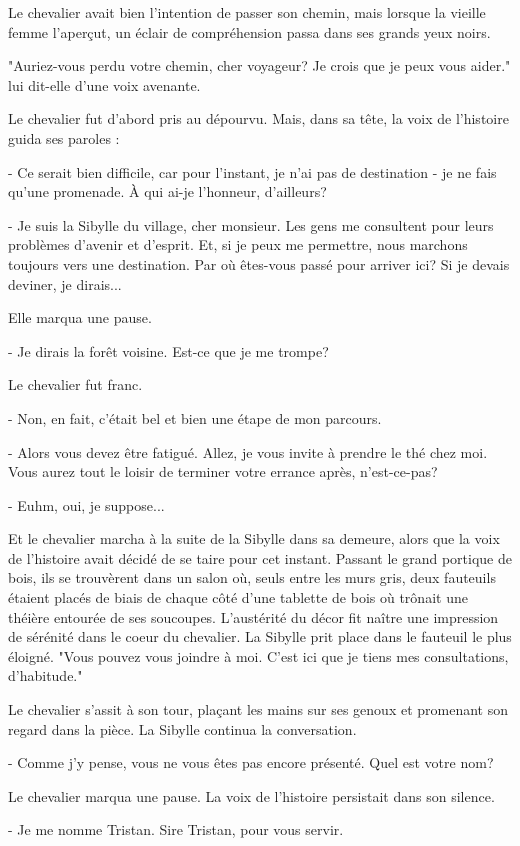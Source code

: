 \documentclass[a4paper,11pt, openany]{book}
\begin{document}
Le chevalier avait bien l'intention de passer son chemin, mais lorsque la vieille femme l'aperçut, un éclair de compréhension passa dans ses grands yeux noirs.

"Auriez-vous perdu votre chemin, cher voyageur? Je crois que je peux vous aider." lui dit-elle d'une voix avenante.

Le chevalier fut d'abord pris au dépourvu. Mais, dans sa tête, la voix de l'histoire guida ses paroles : 

- Ce serait bien difficile, car pour l'instant, je n'ai pas de destination - je ne fais qu'une promenade. À qui ai-je l'honneur, d'ailleurs?

- Je suis la Sibylle du village, cher monsieur. Les gens me consultent pour leurs problèmes d'avenir et d'esprit. 
Et, si je peux me permettre, nous marchons toujours vers une destination. Par où êtes-vous passé pour arriver ici? Si je devais deviner, je dirais...

Elle marqua une pause.

- Je dirais la forêt voisine. Est-ce que je me trompe?

Le chevalier fut franc.

- Non, en fait, c'était bel et bien une étape de mon parcours.

- Alors vous devez être fatigué. Allez, je vous invite à prendre le thé chez moi. Vous aurez tout le loisir de terminer votre errance après, n'est-ce-pas?

- Euhm, oui, je suppose...

Et le chevalier marcha à la suite de la Sibylle dans sa demeure, alors que la voix de l'histoire avait décidé de se taire pour cet instant. 
Passant le grand portique de bois, ils se trouvèrent dans un salon où, seuls entre les murs gris, 
deux fauteuils étaient placés de biais de chaque côté d'une tablette de bois où trônait une théière entourée de ses soucoupes. L'austérité du décor fit naître une impression de sérénité dans le coeur du chevalier.
La Sibylle prit place dans le fauteuil le plus éloigné.
"Vous pouvez vous joindre à moi. C'est ici que je tiens mes consultations, d'habitude."

Le chevalier s'assit à son tour, plaçant les mains sur ses genoux et promenant son regard dans la pièce. La Sibylle continua la conversation.

- Comme j'y pense, vous ne vous êtes pas encore présenté. Quel est votre nom?

Le chevalier marqua une pause. La voix de l'histoire persistait dans son silence.

- Je me nomme Tristan. Sire Tristan, pour vous servir.
\end{document}
